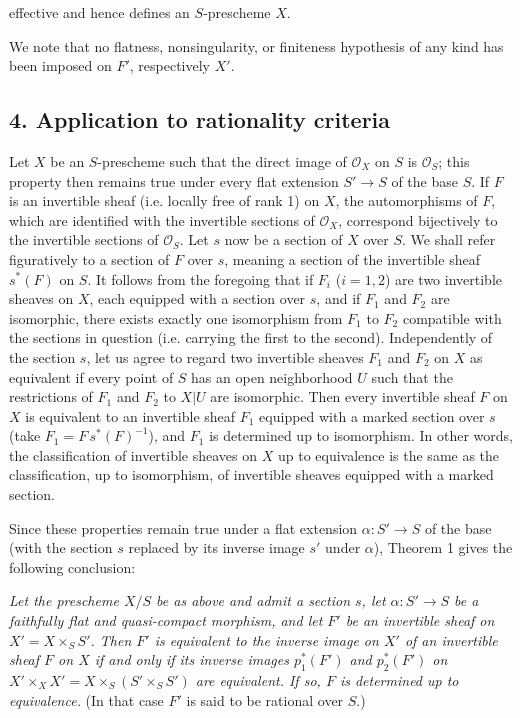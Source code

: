 effective and hence defines an $S$-prescheme $X$.

We note that no flatness, nonsingularity, or finiteness hypothesis of any kind
has been imposed on $F'$, respectively $X'$.

\subsection*{4. Application to rationality criteria}

Let $X$ be an $S$-prescheme such that the direct image of $\mathcal O_X$ on $S$
is $\mathcal O_S$; this property then remains true under every flat extension
$S'\longrightarrow S$ of the base $S$. If $F$ is an invertible sheaf (i.e.
locally free of rank 1) on $X$, the automorphisms of $F$, which are identified
with the invertible sections of $\mathcal O_X$, correspond bijectively to the
invertible sections of $\mathcal O_S$. Let $s$ now be a section of $X$ over
$S$. We shall refer figuratively to a section of $F$ over $s$, meaning a
section of the invertible sheaf $s^*(F)$ on $S$. It follows from the foregoing
that if $F_i$ ($i=1,2$) are two invertible sheaves on $X$, each equipped with a
section over $s$, and if $F_1$ and $F_2$ are isomorphic, there exists exactly
one isomorphism from $F_1$ to $F_2$ compatible with the sections in question
(i.e. carrying the first to the second). Independently of the section $s$, let
us agree to regard two invertible sheaves $F_1$ and $F_2$ on $X$ as equivalent
if every point of $S$ has an open neighborhood $U$ such that the restrictions
of $F_1$ and $F_2$ to $X|U$ are isomorphic. Then every invertible sheaf $F$ on
$X$ is equivalent to an invertible sheaf $F_1$ equipped with a marked section
over $s$ (take $F_1=F\,s^*(F)^{-1}$), and $F_1$ is determined up to
isomorphism. In other words, the classification of invertible sheaves on $X$
up to equivalence is the same as the classification, up to isomorphism, of
invertible sheaves equipped with a marked section.

Since these properties remain true under a flat extension
$\alpha:S'\longrightarrow S$ of the base (with the section $s$ replaced by its
inverse image $s'$ under $\alpha$), Theorem 1 gives the following conclusion:

\emph{Let the prescheme $X/S$ be as above and admit a section $s$, let
$\alpha:S'\longrightarrow S$ be a faithfully flat and quasi-compact morphism,
and let $F'$ be an invertible sheaf on $X'=X\times_SS'$. Then $F'$ is equivalent
to the inverse image on $X'$ of an invertible sheaf $F$ on $X$ if and only if
its inverse images $p_1^*(F')$ and $p_2^*(F')$ on
$X'\times_XX'=X\times_S(S'\times_SS')$ are equivalent. If so, $F$ is
determined up to equivalence.} (In that case $F'$ is said to be rational over
$S$.)

